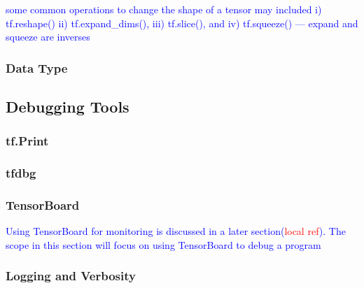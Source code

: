 \textcolor{blue}{some common operations to change the shape of a tensor may included i) tf.reshape() ii) tf.expand\_dims(), iii) tf.slice(), and iv) tf.squeeze() --- expand and squeeze are inverses} 

\subsubsection{Data Type}

\subsection{Debugging Tools}

\subsubsection{tf.Print}

\subsubsection{tfdbg}



\subsubsection{TensorBoard}


\textcolor{blue}{Using TensorBoard for monitoring is discussed in a later section(\textcolor{red}{local ref}). The scope in this section will focus on using TensorBoard to debug a program}

\subsubsection{Logging and Verbosity}






